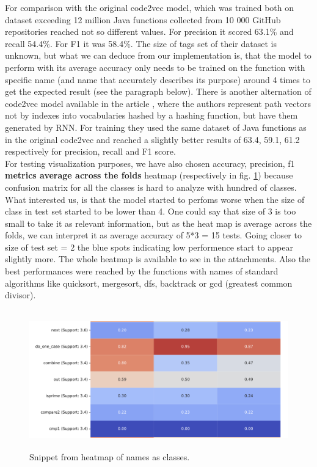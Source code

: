 \documentclass[10pt,english,a4paper]{report}
\begin{document}
For comparison with the original code2vec model, which was trained both on dataset exceeding 12 million Java functions
collected from 10 000 GitHub repositories reached not so different values. For precision it scored 63.1\% and recall 54.4\%.
For F1 it was 58.4\%. The size of tags set of their dataset is unknown, but what we can deduce from our 
implementation is, that the model to perform with its average accuracy only needs to be trained on the function with 
specific name (and name that accurately describes its purpose) around 4 times to get the expected result (see the paragraph below).
There is another alternation of code2vec model available in the article \cite{improved_rnn}, where the authors represent 
path vectors not by indexes into vocabularies hashed by a hashing function, but have them generated by RNN. For training they
used the same dataset of Java functions as in the original code2vec and reached a slightly better results
of 63.4, 59.1, 61.2 respectively for precision, recall and F1 score. \\

For testing visualization purposes, we have also chosen accuracy, precision, f1 \textbf{metrics average across the folds} heatmap (respectively in fig. \ref{fig:heatmap_snippet}) because 
confusion matrix for all the classes is hard to analyze with hundred of classes. What interested us,
is that the model started to perfoms worse  when the size of class in test set started to be lower than 4. 
One could say that size of 3 is too small to take it as relevant information, but as the heat map is average
across the folds, we can interpret it as average accuracy of 5*3 = 15 tests. Going closer to size of test set = 2
the blue spots indicating low performence start to appear slightly more. The whole heatmap is available to see in the attachments. Also the best
performances were reached by the functions with names of standard algorithms like quicksort, mergesort, dfs, backtrack or gcd (greatest common divisor). 


\begin{figure}[H]
    \centering
    \includegraphics[width=16cm, height=6cm]{figures/heatmap_snippet.png}
    \caption{Snippet from heatmap of names as classes.}
    \label{fig:heatmap_snippet}
\end{figure}
\end{document}
